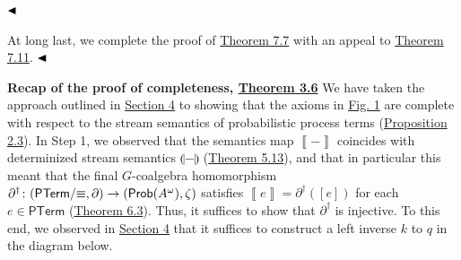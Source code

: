 \documentclass[11pt,a4paper]{amsart}
\begin{document}
\hypertarget{html:S7.SS0.SSS0.P0.SPx7.p2.m16}{}\({\hfill\blacktriangleleft}\)
\par\medskip
\hypertarget{html:S7.SS0.SSS0.P0.SPx7.p3}{} At long last, we complete the proof of \hyperlink{html:S7.Thmtheorem7}{Theorem 7.7} with an appeal to \hyperlink{html:S7.Thmtheorem11}{Theorem 7.11}. %
\hypertarget{html:S7.SS0.SSS0.P0.SPx7.p3.m1}{}\({\hfill\blacktriangleleft}\)
\par\medskip
\hypertarget{html:S7.SS0.SSS0.Px1}{} \par\noindent\textbf{Recap of the proof of completeness, \hyperlink{html:S3.Thmtheorem6}{Theorem 3.6}}\quad  %
\hypertarget{html:S7.SS0.SSS0.Px1.p1}{} We have taken the approach outlined in \hyperlink{html:S4}{Section 4} to showing that the axioms in \hyperlink{html:S3.F1}{Fig. 1} are complete with respect to the stream semantics of probabilistic process terms (\hyperlink{html:S2.Thmtheorem3}{Proposition 2.3}). In Step 1, we observed that the semantics map %
\hypertarget{html:S7.SS0.SSS0.Px1.p1.m1}{}\({\left\llbracket{-}\right\rrbracket}\) coincides with determinized stream semantics %
\hypertarget{html:S7.SS0.SSS0.Px1.p1.m2}{}\({\llparenthesis{-}\rrparenthesis}\) (\hyperlink{html:S5.Thmtheorem13}{Theorem 5.13}), and that in particular this meant that the final %
\hypertarget{html:S7.SS0.SSS0.Px1.p1.m3}{}\({G}\)-coalgebra homomorphism %
\hypertarget{html:S7.SS0.SSS0.Px1.p1.m4}{}\({\partial^{\dagger}\colon(\mathsf{PTerm}/{\equiv},\partial)\to(\text{\sf Prob}(A^{\omega}),\zeta)}\) satisfies %
\hypertarget{html:S7.SS0.SSS0.Px1.p1.m5}{}\({\left\llbracket{e}\right\rrbracket=\partial^{\dagger}([e])}\) for each %
\hypertarget{html:S7.SS0.SSS0.Px1.p1.m6}{}\({e\in\mathsf{PTerm}}\) (\hyperlink{html:S6.Thmtheorem3}{Theorem 6.3}). Thus, it suffices to show that %
\hypertarget{html:S7.SS0.SSS0.Px1.p1.m7}{}\({\partial^{\dagger}}\) is injective. To this end, we observed in \hyperlink{html:S4}{Section 4} that it suffices to construct a left inverse %
\hypertarget{html:S7.SS0.SSS0.Px1.p1.m8}{}\({k}\) to %
\hypertarget{html:S7.SS0.SSS0.Px1.p1.m9}{}\({q}\) in the diagram below.
\end{document}
